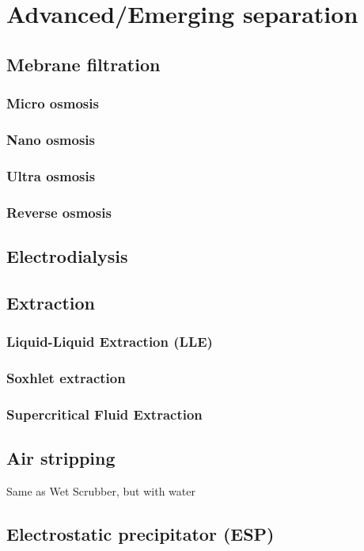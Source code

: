 \documentclass{article}
\begin{document}
\newpage
\section{Advanced/Emerging separation}

\subsection{Mebrane filtration}

\subsubsection{Micro osmosis}

\subsubsection{Nano osmosis}

\subsubsection{Ultra osmosis}

\subsubsection{Reverse osmosis}

\subsection{Electrodialysis}

\subsection{Extraction}

\subsubsection{Liquid-Liquid Extraction (LLE)}

\subsubsection{Soxhlet extraction}

\subsubsection{Supercritical Fluid Extraction}

\subsection{Air stripping}
Same as Wet Scrubber, but with water

\subsection{Electrostatic precipitator (ESP)}
\end{document}
